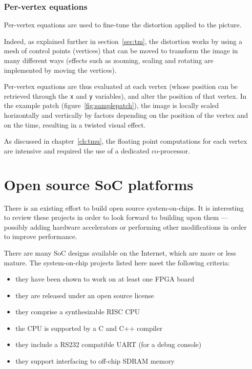 \documentclass[a4paper,11pt]{kthesis}
\begin{document}
\subsubsection{Per-vertex equations}
Per-vertex equations are used to fine-tune the distortion applied to the picture.

Indeed, as explained further in section~\ref{sec:tm}, the distortion works by using a mesh of control points (vertices) that can be moved to transform the image in many different ways (effects such as zooming, scaling and rotating are implemented by moving the vertices).

Per-vertex equations are thus evaluated at each vertex (whose position can be retrieved through the \verb!x! and \verb!y! variables), and alter the position of that vertex. In the example patch (figure~\ref{fig:samplepatch}), the image is locally scaled horizontally and vertically by factors depending on the position of the vertex and on the time, resulting in a twisted visual effect.

As discussed in chapter~\ref{ch:tmu}, the floating point computations for each vertex are intensive and required the use of a dedicated co-processor.

\section{Open source SoC platforms}
There is an existing effort to build open source system-on-chips. It is interesting to review these projects in order to look forward to building upon them --- possibly adding hardware accelerators or performing other modifications in order to improve performance.

There are many SoC designs available on the Internet, which are more or less mature. The system-on-chip projects listed here meet the following criteria:
\begin{itemize}
\item they have been shown to work on at least one FPGA board
\item they are released under an open source license
\item they comprise a synthesizable RISC CPU
\item the CPU is supported by a C and C++ compiler
\item they include a RS232 compatible UART (for a debug console)
\item they support interfacing to off-chip SDRAM memory
\end{itemize}
\end{document}
